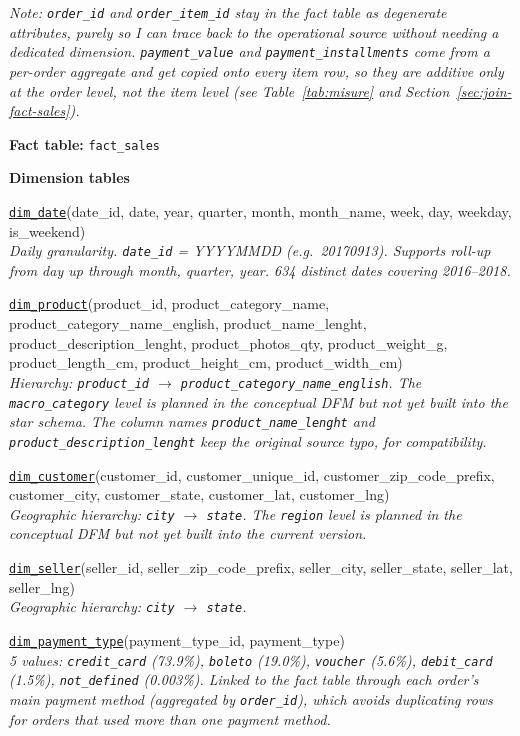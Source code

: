 \documentclass[12pt,a4paper]{article}
\begin{document}
\textit{Note: \texttt{order\_id} and \texttt{order\_item\_id} stay in the fact table
as degenerate attributes, purely so I can trace back to the operational source
without needing a dedicated dimension. \texttt{payment\_value} and
\texttt{payment\_installments} come from a per-order aggregate and get copied onto
every item row, so they are additive only at the order level, not the item level
(see Table~\ref{tab:misure} and Section~\ref{sec:join-fact-sales}).}

\textbf{Fact table:} \texttt{fact\_sales}

\medskip
\textbf{Dimension tables}

\underline{\texttt{dim\_date}}(date\_id, date, year, quarter, month, month\_name, week, day, weekday, is\_weekend)\\
\textit{Daily granularity. \texttt{date\_id} = YYYYMMDD (e.g.\ 20170913). Supports
roll-up from day up through month, quarter, year. 634 distinct dates covering
2016--2018.}

\medskip
\underline{\texttt{dim\_product}}(product\_id, product\_category\_name,
product\_category\_name\_english, product\_name\_lenght, product\_description\_lenght,
product\_photos\_qty, product\_weight\_g, product\_length\_cm, product\_height\_cm,
product\_width\_cm)\\
\textit{Hierarchy: \texttt{product\_id} $\to$
\texttt{product\_category\_name\_english}. The \texttt{macro\_category} level is
planned in the conceptual DFM but not yet built into the star schema. The column
names \texttt{product\_name\_lenght} and \texttt{product\_description\_lenght} keep
the original source typo, for compatibility.}

\medskip
\underline{\texttt{dim\_customer}}(customer\_id, customer\_unique\_id,
customer\_zip\_code\_prefix, customer\_city, customer\_state, customer\_lat, customer\_lng)\\
\textit{Geographic hierarchy: \texttt{city} $\to$ \texttt{state}. The \texttt{region}
level is planned in the conceptual DFM but not yet built into the current version.}

\medskip
\underline{\texttt{dim\_seller}}(seller\_id, seller\_zip\_code\_prefix, seller\_city,
seller\_state, seller\_lat, seller\_lng)\\
\textit{Geographic hierarchy: \texttt{city} $\to$ \texttt{state}.}

\medskip
\underline{\texttt{dim\_payment\_type}}(payment\_type\_id, payment\_type)\\
\textit{5 values: \texttt{credit\_card} (73.9\%), \texttt{boleto} (19.0\%),
\texttt{voucher} (5.6\%), \texttt{debit\_card} (1.5\%), \texttt{not\_defined}
(0.003\%). Linked to the fact table through each order's main payment method
(aggregated by \texttt{order\_id}), which avoids duplicating rows for orders that
used more than one payment method.}
\end{document}
